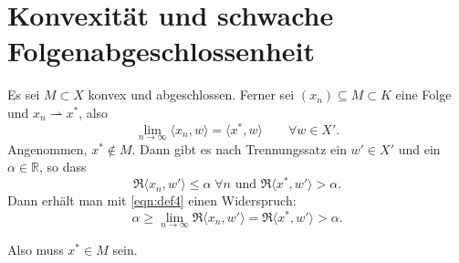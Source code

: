 \documentclass[a4paper]{article}
\DeclareMathOperator{\wto}{\rightharpoonup}
\begin{document}
\section{Konvexität und schwache Folgenabgeschlossenheit}
Es sei $M\subset X$ konvex und abgeschlossen. 
Ferner sei $(x_n)\subseteq M\subset K$ eine Folge und $x_n\wto x^*$, also
\begin{equation}\label{eqn:def4}\lim_{n\to ∞} \langle x_n, w \rangle = \langle x^* , w \rangle\qquad ∀w\in X'.\end{equation}
Angenommen, $x^*\notin M$. 
Dann gibt es nach Trennungssatz ein $w'\in X'$ und ein $α\in ℝ$, so dass
$$\Re \langle x_n, w' \rangle \le α \; ∀ n \text{ und }\Re \langle x^*, w' \rangle > α.$$  
Dann erhält man mit \eqref{eqn:def4} einen Widerspruch:
$$α \ge \lim_{n\to ∞} \Re \langle x_n, w'\rangle = \Re \langle x^*, w' \rangle > α.$$

Also muss $x^*\in M$ sein.
\end{document}
